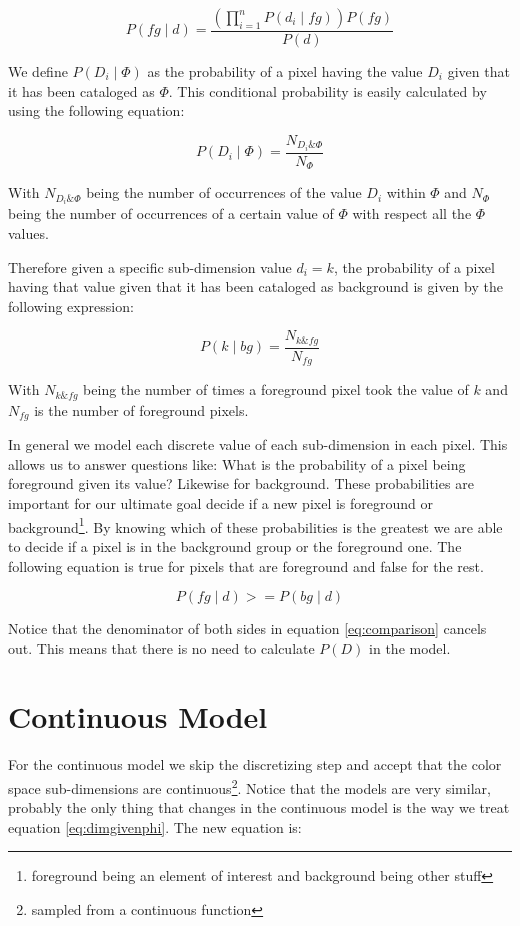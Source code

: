 \documentclass[a4paper,12pt]{report}
\begin{document}
\begin{equation}
P(fg \mid d) = \frac{(\prod_{i=1}^n{P(d_i \mid fg)}) P(fg)}{P(d)}
\end{equation}

We define $P(D_i \mid \Phi)$ as the probability of a pixel having the value $D_i$
given that it has been cataloged as $\Phi$. This conditional probability is
easily calculated by using the following equation:

\begin{equation}\label{eq:dimgivenphi}
P(D_i \mid \Phi) = \frac{N_{D_i\&\Phi}}{N_{\Phi}}
\end{equation}

With $N_{D_i\&\Phi}$ being the number of occurrences of the value $D_i$ within
$\Phi$ and $N_{\Phi}$ being the number of occurrences of a certain value of
$\Phi$ with respect all the $\Phi$ values.

Therefore given a specific sub-dimension value $d_i=k$, the probability of a
pixel having that value given that it has been cataloged as background is given
by the following expression:

\begin{equation}
P(k \mid bg) = \frac{N_{k\&fg}}{N_{fg}}
\end{equation}

With $N_{k\&fg}$ being the number of times a foreground pixel took the value of
$k$ and $N_{fg}$ is the number of foreground pixels.

In general we model each discrete value of each sub-dimension in
each pixel. This allows us to answer questions like: What is the probability of
a pixel being foreground given its value? Likewise for background.
These probabilities are important for our ultimate goal decide if a new pixel
is foreground or background\footnote{foreground being an element of interest
and background being other stuff}. By knowing which of these probabilities is
the greatest we are able to decide if a pixel is in the background group or the
foreground one. The following equation is true for pixels that are foreground
and false for the rest.

\begin{equation}\label{eq:comparison}
P(fg \mid d) >= P(bg \mid d)
\end{equation}

Notice that the denominator of both sides in equation \ref{eq:comparison}
cancels out. This means that there is no need to calculate $P(D)$ in the model.

\section{Continuous Model}
For the continuous model we skip the discretizing step and accept that the
color space sub-dimensions are continuous\footnote{sampled from
a continuous function}. Notice that the models are very similar, probably the
only thing that changes in the continuous model is the way we treat equation
\ref{eq:dimgivenphi}. The new equation is:
\end{document}
